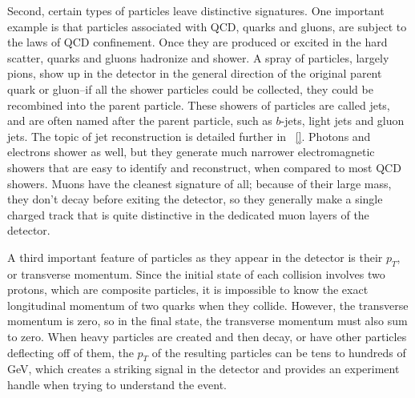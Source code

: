 Second, certain types of particles leave distinctive signatures.  One important example is that particles associated with QCD, quarks and gluons, are subject to the laws of QCD confinement.  Once they are produced or excited in the hard scatter, quarks and gluons hadronize and shower.  A spray of particles, largely pions, show up in the detector in the general direction of the original parent quark or gluon--if all the shower particles could be collected, they could be recombined into the parent particle.  These showers of particles are called jets, and are often named after the parent particle, such as $b$-jets, light jets and gluon jets.  The topic of jet reconstruction is detailed further in ~\ref{}.  Photons and electrons shower as well, but they generate much narrower electromagnetic showers that are easy to identify and reconstruct, when compared to most QCD showers.  Muons have the cleanest signature of all; because of their large mass, they don't decay before exiting the detector, so they generally make a single charged track that is quite distinctive in the dedicated muon layers of the detector.

A third important feature of particles as they appear in the detector is their $p_T$, or transverse momentum.  Since the initial state of each collision involves two protons, which are composite particles, it is impossible to know the exact longitudinal momentum of two quarks when they collide.  However, the transverse momentum is zero, so in the final state, the transverse momentum must also sum to zero.  When heavy particles are created and then decay, or have other particles deflecting off of them, the $p_T$ of the resulting particles can be tens to hundreds of GeV, which creates a striking signal in the detector and provides an experiment handle when trying to understand the event.










